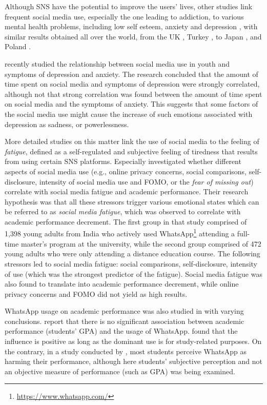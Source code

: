 \documentclass[a4paper,fleqn]{cas-dc}
\begin{document}
Although SNS have the potential to  improve the users' lives, other studies link frequent social media use, especially the one leading to addiction,  to various mental health problems, including low self esteem, anxiety and depression  
\citep{beran2005cyber, hinduja2008cyberbullying,campbell2012victims,woods2016sleepyteens}, with similar results obtained all over the world, from the UK \citep{kelly2018social}, Turkey \citep{kircaburun2016self}, to Japan \citep{kitazawa2018associations}, and Poland \citep{pyzalski2019polish}.

\citet{culpepperexploring} recently studied the relationship between social media use in youth and symptoms of depression and anxiety. The research concluded that the amount of time spent on social media and symptoms of depression were strongly correlated, although not that strong correlation was found between the amount of time spent on social media and the symptoms of anxiety. This suggests that some factors of the social media use might cause the increase of such emotions associated with depression as sadness, or powerlessness.

More detailed studies on this matter link the use of social media to the feeling of \textit{fatigue}, defined as a self-regulated and subjective feeling of tiredness that results from using certain SNS platforms. Especially \citet{malik2020correlates} investigated whether different aspects of social media use (e.g., online privacy concerns, social comparisons, self-disclosure, intensity of social media use and FOMO, or the \textit{fear of missing out})
 correlate with social media fatigue and academic performance. Their research hypothesis was that all these  stressors  trigger various emotional states which can be referred to as \textit{social media fatigue}, which was observed to  correlate with  academic performance decrement. 
The first group in that study comprised of 1,398 young adults from India who actively used WhatsApp\footnote{\url{https://www.whatsapp.com/}} attending a full-time master's program at the university, while the second group comprised of  472 young adults who were only attending a distance education course. The following stressors led to social media fatigue: social comparisons, self-disclosure, intensity of use (which was the strongest predictor of the fatigue). Social media fatigue was also found to translate into academic performance decrement, while online privacy concerns and FOMO did not yield as high results.

WhatsApp usage on academic performance was also studied in \citep{Alkhalaf2018, Afful2020, yeboah2014impact} with varying conclusions. \citet{Alkhalaf2018} report that there is no significant association between academic performance (students' GPA) and the usage of WhatsApp. \citet{Afful2020} found that the influence is positive as long as the dominant use is for study-related purposes. On the contrary, in a study conducted by \citet{yeboah2014impact}, most students perceive WhatsApp as harming their performance, although here  students' subjective perception and  not an objective measure of performance (such as  GPA) was being examined.
\end{document}
